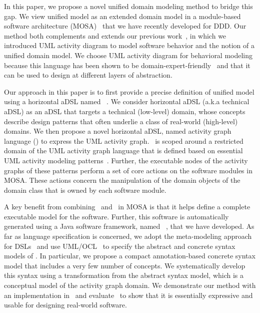 In this paper, we propose a novel unified domain modeling method to bridge this gap. 
We view unified model as an extended domain model in a module-based software architecture (MOSA)~\cite{le_generative_2018} that we have recently developed for DDD.
Our method both complements and extends our previous work~\cite{le_domain_2018}, in which we introduced UML activity diagram to model software behavior and the notion of a unified domain model.
We choose UML activity diagram for behavioral modeling because this language has been shown to be domain-expert-friendly~\cite{dumas_uml_2001} and that it can be used to design at different layers of abstraction. 

Our approach in this paper is to first provide a precise definition of unified model using a horizontal aDSL named \dcsl~\cite{le_domain_2018}. We consider horizontal aDSL (a.k.a technical aDSL) as an aDSL that targets a technical (low-level) domain, whose concepts describe design patterns that often underlie a class of real-world (high-level) domains. 
%
We then propose a novel horizontal aDSL, named activity graph language (\agl) to express the UML activity graph. \agl~is scoped around a restricted domain of the UML activity graph language that is defined based on essential UML activity modeling patterns~\cite{omg_unified_2015}. 
Further, the executable nodes of the activity graphs of these patterns perform a set of core actions on the software modules in MOSA. These actions concern the manipulation of the domain objects of the domain class that is owned by each software module.

A key benefit from combining \dcsl~and \agl~in MOSA is that it helps define a complete executable model for the software. Further, this software is automatically generated using a Java software framework, named \jdomainapp~\cite{le_jdomainapp_2017}, that we have developed.
%
As far as language specification is concerned, we adopt the meta-modeling approach for DSLs~\cite{kleppe_software_2008} and use UML/OCL~\cite{omg_unified_2015, omg_object_2014} to specify the abstract and concrete syntax models of \agl. In particular, we propose a compact annotation-based concrete syntax model that includes a very few number of concepts. We systematically develop this syntax using a transformation from the abstract syntax model, which is a conceptual model of the activity graph domain.
%
We demonstrate our method with an implementation in \jdomainapp~and evaluate \agl~to show that it is essentially expressive and usable for designing real-world software. 

